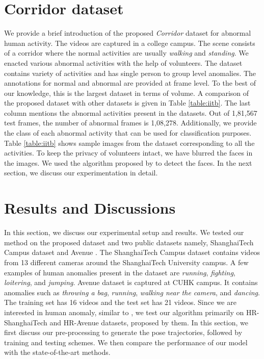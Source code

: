 \documentclass[conference]{IEEEtran}
\begin{document}
\section{Corridor dataset}
\label{corridor}
We provide a brief introduction of the proposed \textit{Corridor} dataset for abnormal human activity. The videos are captured in a college campus. The scene consists of a corridor where the normal activities are usually \textit{walking} and \textit{standing}. We enacted various abnormal activities with the help of volunteers. The dataset contains variety of activities and has single person to group level anomalies. The annotations for normal and abnormal are provided at frame level. To the best of our knowledge, this is the largest dataset in terms of volume. A comparison of the proposed dataset with other datasets is given in Table \ref{table:iitb}. The last column mentions the abnormal activities present in the datasets. Out of 1,81,567 test frames, the number of abnormal frames is 1,08,278. Additionally, we provide the class of each abnormal activity that can be used for classification purposes. Table \ref{table:iitb} shows sample images from the dataset corresponding to all the activities. To keep the privacy of volunteers intact, we have blurred the faces in the images. We used the algorithm proposed by \cite{face} to detect the faces. In the next section, we discuss our experimentation in detail.






\section{Results and Discussions}
\label{exp}
In this section, we discuss our experimental setup and results. We tested our method on the proposed dataset and two public datasets namely, ShanghaiTech Campus dataset \cite{TSC-RNN} and Avenue \cite{Avenue}. The ShanghaiTech Campus dataset contains videos from 13 different cameras around the ShanghaiTech University campus. A few examples of human anomalies present in the dataset are \textit{running}, \textit{fighting}, \textit{loitering}, and \textit{jumping}. Avenue dataset is captured at CUHK campus. It contains anomalies such as \textit{throwing a bag}, \textit{running}, \textit{walking near the camera}, and \textit{dancing}. The training set has 16 videos and the test set has 21 videos. Since we are interested in human anomaly, similar to \cite{pose}, we test our algorithm primarily on HR-ShanghaiTech and HR-Avenue datasets, proposed by them. In this section, we first discuss our pre-processing to generate the pose trajectories, followed by training and testing schemes. We then compare the performance of our model with the state-of-the-art methods.
\end{document}
